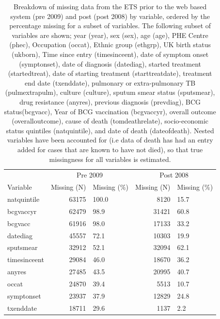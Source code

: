 \documentclass[11pt,twoside]{bristolthesis}
\begin{document}
  \begin{table}[H]
  
  \caption[Breakdown of missing data from the ETS prior to the web based system (pre 2009) and post (post 2008) by variable, ordered by the  percentage missing for a subset of variables.]{\label{tab:missing-var-tabs}Breakdown of missing data from the ETS prior to the web based system (pre 2009) and post (post 2008) by variable, ordered by the  percentage missing for a subset of variables. The following subset of variables are shown; year (year), sex (sex), age (age), PHE Centre (phec), Occupation (occat), Ethnic group (ethgrp), UK birth status (ukborn), Time since entry (timesinceent), date of symptom onset (symptonset), date of diagnosis (datediag), started treatment (startedtreat), date of starting treatment (starttreatdate), treatment end date (txenddate), pulmonary or extra-pulmonary TB (pulmextrapulm), culture (culture), sputum smear status (sputsmear), drug resistance (anyres), previous diagnosis (prevdiag), BCG status(bcgvacc), Year of BCG vaccination (bcgvaccyr), overall outcome (overalloutcome), cause of death (tomdeathrelate), socio-economic status quintiles (natquintile), and date of death (dateofdeath). Nested variables have been accounted for (i.e data of death has had an entry added for cases that are known to have not died), so that true missingness for all variables is estimated.}
  \centering
  \begin{tabular}{lrlrl}
  \toprule
  \multicolumn{1}{c}{ } & \multicolumn{2}{c}{Pre 2009} & \multicolumn{2}{c}{Post 2008} \\
  \cmidrule(l{3pt}r{3pt}){2-3} \cmidrule(l{3pt}r{3pt}){4-5}
  Variable & Missing (N) &  Missing (\%) & Missing (N) &  Missing (\%)\\
  \midrule
  natquintile & 63175 & 100.0 & 8120 & 15.7\\
  bcgvaccyr & 62479 & 98.9 & 31421 & 60.8\\
  bcgvacc & 61916 & 98.0 & 17133 & 33.2\\
  datediag & 45557 & 72.1 & 10303 & 19.9\\
  sputsmear & 32912 & 52.1 & 32094 & 62.1\\
  \addlinespace
  timesinceent & 29084 & 46.0 & 18670 & 36.2\\
  anyres & 27485 & 43.5 & 20995 & 40.7\\
  occat & 24870 & 39.4 & 5513 & 10.7\\
  symptonset & 23937 & 37.9 & 12829 & 24.8\\
  txenddate & 18711 & 29.6 & 1137 & 2.2\\

\end{tabular}
\end{table}
\end{document}
